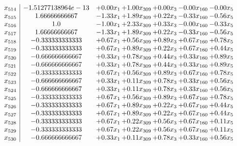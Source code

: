 \documentclass[8pt]{article}
\begin{document}
\[\begin{array}{c| c c@{\hskip 2pt} c@{\hskip 2pt} c@{\hskip 2pt} c@{\hskip 2pt} c@{\hskip 2pt} }
 x_{514}   &  -1.51277138964e-13 & +  0.00 x_{1} & +  1.00 x_{309} & +  0.00 x_{3} & -0.00 x_{160} & -0.00 x_{5}\\
 x_{515}   &  1.66666666667 & -1.33 x_{1} & +  1.89 x_{309} & +  0.22 x_{3} & -0.33 x_{160} & -0.56 x_{5}\\
 x_{516}   &  1.0 & -1.00 x_{1} & +  2.33 x_{309} & +  0.33 x_{3} & -0.00 x_{160} & -0.33 x_{5}\\
 x_{517}   &  1.66666666667 & -1.33 x_{1} & +  1.89 x_{309} & +  0.22 x_{3} & -0.33 x_{160} & -0.56 x_{5}\\
 x_{518}   &  -0.333333333333 & +  0.67 x_{1} & +  0.56 x_{309} & +  0.89 x_{3} & +  0.67 x_{160} & +  0.78 x_{5}\\
 x_{519}   &  -0.333333333333 & +  0.67 x_{1} & +  0.89 x_{309} & +  0.22 x_{3} & +  0.67 x_{160} & +  0.44 x_{5}\\
 x_{520}   &  -0.666666666667 & +  0.33 x_{1} & +  0.78 x_{309} & +  0.44 x_{3} & +  0.33 x_{160} & +  0.89 x_{5}\\
 x_{521}   &  -0.666666666667 & +  0.33 x_{1} & +  0.78 x_{309} & +  0.44 x_{3} & +  0.33 x_{160} & +  0.89 x_{5}\\
 x_{522}   &  -0.333333333333 & +  0.67 x_{1} & +  0.56 x_{309} & +  0.89 x_{3} & +  0.67 x_{160} & +  0.78 x_{5}\\
 x_{523}   &  -0.666666666667 & +  0.33 x_{1} & +  0.11 x_{309} & +  0.78 x_{3} & +  0.33 x_{160} & +  0.56 x_{5}\\
 x_{524}   &  -0.666666666667 & +  0.33 x_{1} & +  0.11 x_{309} & +  0.78 x_{3} & +  0.33 x_{160} & +  0.56 x_{5}\\
 x_{525}   &  -0.333333333333 & +  0.67 x_{1} & +  0.56 x_{309} & +  0.89 x_{3} & +  0.67 x_{160} & +  0.78 x_{5}\\
 x_{526}   &  -0.333333333333 & +  0.67 x_{1} & +  0.89 x_{309} & +  0.22 x_{3} & +  0.67 x_{160} & +  0.44 x_{5}\\
 x_{527}   &  -0.333333333333 & +  0.67 x_{1} & +  0.89 x_{309} & +  0.22 x_{3} & +  0.67 x_{160} & +  0.44 x_{5}\\
 x_{528}   &  -0.333333333333 & +  0.67 x_{1} & +  0.22 x_{309} & +  0.56 x_{3} & +  0.67 x_{160} & +  0.11 x_{5}\\
 x_{529}   &  -0.333333333333 & +  0.67 x_{1} & +  0.22 x_{309} & +  0.56 x_{3} & +  0.67 x_{160} & +  0.11 x_{5}\\
 x_{530}   &  -0.666666666667 & +  0.33 x_{1} & +  0.11 x_{309} & +  0.78 x_{3} & +  0.33 x_{160} & +  0.56 x_{5}\\

\end{array}\]
\end{document}
